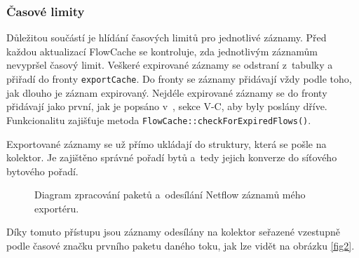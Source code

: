 \documentclass[a4paper, 11pt]{article}
\begin{document}
\begin{sloppypar}
\subsubsection*{Časové limity} \label{timelimits}
Důležitou součástí je hlídání časových limitů pro jednotlivé záznamy. Před každou aktualizací FlowCache se kontroluje, zda jednotlivým záznamům nevypršel časový limit. Veškeré expirované záznamy se odstraní z~tabulky a přiřadí do fronty \verb|exportCache|. Do fronty se záznamy přidávají vždy podle toho, jak dlouho je záznam expirovaný. Nejdéle expirované záznamy se do fronty přidávají jako první, jak je popsáno v~\cite{flows}, sekce V-C, aby byly poslány dříve. Funkcionalitu zajišťuje metoda \texttt{FlowCache::checkForExpiredFlows()}.

Exportované záznamy se už přímo ukládají do struktury, která se pošle na kolektor. Je zajištěno správné pořadí bytů a~tedy jejich konverze do síťového bytového pořadí.


\begin{figure}[ht]
    \begin{center}
        \caption{Diagram zpracování paketů a~odesílání Netflow záznamů mého exportéru.}
        \label{fig1}
    \end{center}
\end{figure}

Díky tomuto přístupu jsou záznamy odesílány na kolektor seřazené vzestupně podle časové značku prvního paketu daného toku, jak lze vidět na obrázku \ref{fig2}.


\end{sloppypar}
\end{document}
